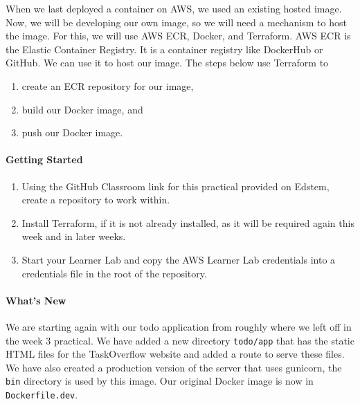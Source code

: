 \documentclass{csse4400}
\begin{document}
When we last deployed a container on AWS, we used an existing hosted image.
Now, we will be developing our own image, so we will need a mechanism to host the image.
For this, we will use AWS ECR, Docker, and Terraform.
AWS ECR is the Elastic Container Registry.
It is a container registry like DockerHub or GitHub.
We can use it to host our image.
The steps below use Terraform to

\begin{enumerate}
    \item create an ECR repository for our image,
    \item build our Docker image, and
    \item push our Docker image.
\end{enumerate}


\paragraph{Getting Started}

\begin{enumerate}
    \item Using the GitHub Classroom link for this practical provided on Edstem, create a repository to work within.
    \item Install Terraform, if it is not already installed, as it will be required again this week and in later weeks.
    \item Start your Learner Lab and copy the AWS Learner Lab credentials into a credentials file in the root of the repository.
\end{enumerate}

\paragraph{What's New}
We are starting again with our todo application from roughly where we left off in the week 3 practical.
We have added a new directory \texttt{todo/app} that has the static HTML files for the TaskOverflow website and added a route to serve these files.
We have also created a production version of the server that uses gunicorn,
the \texttt{bin} directory is used by this image.
Our original Docker image is now in \texttt{Dockerfile.dev}.\\
\end{document}
